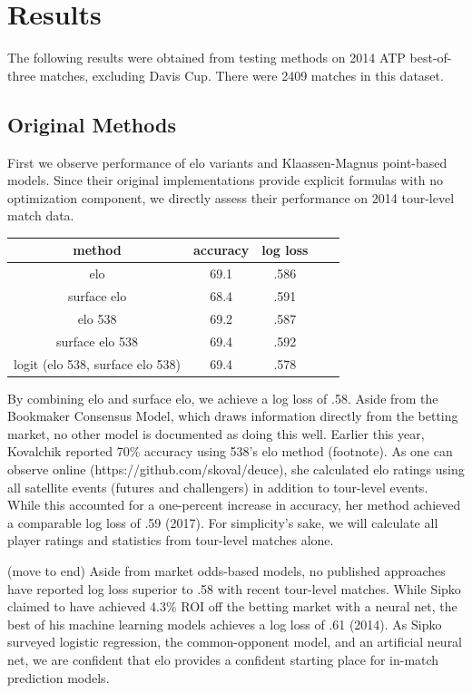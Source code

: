 \documentclass[chapterprefix=false]{report}
\begin{document}
\section{Results}
The following results were obtained from testing methods on 2014 ATP best-of-three matches, excluding Davis Cup. There were 2409 matches in this dataset. 

\subsection{Original Methods}
First we observe performance of elo variants and Klaassen-Magnus point-based models. Since their original implementations provide explicit formulas with no optimization component, we directly assess their performance on 2014 tour-level match data.

\begin{center}
\begin{tabular}{ |c|c|c|c|c| } 
 \hline
 method & accuracy & log loss
 &  &  \\ 
 \hline
  elo & 69.1 & .586
 &  &  \\ 
 \hline
 surface elo & 68.4 & .591
 &  &  \\ 
 \hline
 elo 538 & 69.2 & .587
 &  &  \\ 
 \hline
 surface elo 538 & 69.4 & .592
 &  &  \\ 
 \hline
 logit (elo 538, surface elo 538) & 69.4 & .578
 &  &  \\ 
 \hline
 
\end{tabular}
\end{center}

By combining elo and surface elo, we achieve a log loss of .58. Aside from the Bookmaker Consensus Model, which draws information directly from the betting market, no other model is documented as doing this well. Earlier this year, Kovalchik reported 70$\%$ accuracy using 538's elo method (footnote). As one can observe online (https://github.com/skoval/deuce), she calculated elo ratings using all satellite events (futures and challengers) in addition to tour-level events. While this accounted for a one-percent increase in accuracy, her method achieved a comparable log loss of .59 (2017). For simplicity's sake, we will calculate all player ratings and statistics from tour-level matches alone.


(move to end) Aside from market odds-based models, no published approaches have reported log loss superior to .58 with recent tour-level matches. While Sipko claimed to have achieved 4.3$\%$ ROI off the betting market with a neural net, the best of his machine learning models achieves a log loss of .61 (2014). As Sipko surveyed logistic regression, the common-opponent model, and an artificial neural net, we are confident that elo provides a confident starting place for in-match prediction models.
\end{document}
